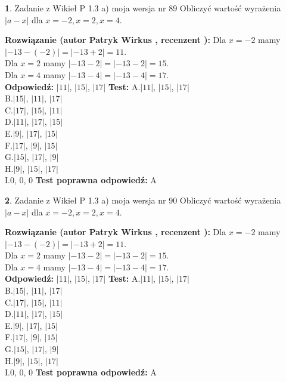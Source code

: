 \documentclass[12pt, a4paper]{article}
\theoremstyle{definition} %
\newtheorem{zad}{}
\newcommand{\zadStart}[1]{\begin{zad}#1\newline}
\newcommand{\zadStop}{\end{zad}}
\newcommand{\rozwStart}[2]{\noindent \textbf{Rozwiązanie (autor #1 , recenzent #2): }\newline}
\newcommand{\rozwStop}{\newline}
\newcommand{\odpStart}{\noindent \textbf{Odpowiedź:}\newline}
\newcommand{\odpStop}{\newline}
\newcommand{\testStart}{\noindent \textbf{Test:}\newline}
\newcommand{\testStop}{\newline}
\newcommand{\kluczStart}{\noindent \textbf{Test poprawna odpowiedź:}\newline}
\newcommand{\kluczStop}{\newline}
\begin{document}
\zadStart{Zadanie z Wikieł P 1.3 a) moja wersja nr 89}
Obliczyć wartość wyrażenia $|a - x|$ dla $x=-2,x=2,x=4$.
\zadStop
\rozwStart{Patryk Wirkus}{}
Dla $x = -2$ mamy $|-13 - (-2)| = |-13 + 2| = 11$.\\
Dla $x = 2$ mamy $|-13 - 2| = |-13 - 2| = 15$.\\
Dla $x = 4$ mamy $|-13 - 4| = |-13 - 4| = 17$.\\
\rozwStop
\odpStart
$|11|$, $|15|$, $|17|$
\odpStop
\testStart
A.$|11|$, $|15|$, $|17|$\\
B.$|15|$, $|11|$, $|17|$\\
C.$|17|$, $|15|$, $|11|$\\
D.$|11|$, $|17|$, $|15|$\\
E.$|9|$, $|17|$, $|15|$\\
F.$|17|$, $|9|$, $|15|$\\
G.$|15|$, $|17|$, $|9|$\\
H.$|9|$, $|15|$, $|17|$\\
I.$0$, $0$, $0$
\testStop
\kluczStart
A
\kluczStop



\zadStart{Zadanie z Wikieł P 1.3 a) moja wersja nr 90}
Obliczyć wartość wyrażenia $|a - x|$ dla $x=-2,x=2,x=4$.
\zadStop
\rozwStart{Patryk Wirkus}{}
Dla $x = -2$ mamy $|-13 - (-2)| = |-13 + 2| = 11$.\\
Dla $x = 2$ mamy $|-13 - 2| = |-13 - 2| = 15$.\\
Dla $x = 4$ mamy $|-13 - 4| = |-13 - 4| = 17$.\\
\rozwStop
\odpStart
$|11|$, $|15|$, $|17|$
\odpStop
\testStart
A.$|11|$, $|15|$, $|17|$\\
B.$|15|$, $|11|$, $|17|$\\
C.$|17|$, $|15|$, $|11|$\\
D.$|11|$, $|17|$, $|15|$\\
E.$|9|$, $|17|$, $|15|$\\
F.$|17|$, $|9|$, $|15|$\\
G.$|15|$, $|17|$, $|9|$\\
H.$|9|$, $|15|$, $|17|$\\
I.$0$, $0$, $0$
\testStop
\kluczStart
A
\kluczStop
\end{document}
